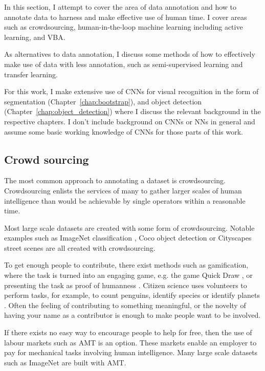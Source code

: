 In this section, I attempt to cover the area of data annotation and how to annotate data to harness and make effective use of human time. I cover areas such as crowdsourcing, human-in-the-loop machine learning including active learning, and \gls{VBA}.

As alternatives to data annotation, I discuss some methods of how to effectively make use of data with less annotation, such as semi-supervised learning and transfer learning. 

For this work, I make extensive use of \gls{CNN}s for visual recognition in the form of segmentation (Chapter~\ref{chap:bootstrap}), and object detection (Chapter~\ref{chap:object_detection}) where I discuss the relevant background in the respective chapters. I don't include background on \gls{CNN}s or \gls{NN}s in general and assume some basic working knowledge of \gls{CNN}s for those parts of this work.


\subsection {Crowd sourcing}

The most common approach to annotating a dataset is crowdsourcing. Crowdsourcing enlists the services of many to gather larger scales of human intelligence than would be achievable by single operators within a reasonable time.

Most large scale datasets are created with some form of crowdsourcing. Notable examples such as ImageNet classification \cite{JiaDeng2009}, Coco object detection \cite{Lin2014} or Cityscapes street scenes \cite{Cordts2016} are all created with crowdsourcing. 

To get enough people to contribute, there exist methods such as gamification, where the task is turned into an engaging game, e.g. the game Quick Draw \cite{Ha2017}, or presenting the task as proof of humanness \cite{Goodfellow2013a}. Citizen science uses volunteers to perform tasks, for example, to count penguins, identify species or identify planets \cite{Simpson2014, Masters2016}. Often the feeling of contributing to something meaningful, or the novelty of having your name as a contributor is enough to make people want to be involved.

If there exists no easy way to encourage people to help for free, then the use of labour markets such as \gls{AMT} is an option. These markets enable an employer to pay for mechanical tasks involving human intelligence. Many large scale datasets such as ImageNet \cite{Russakovsky2015} are built with \gls{AMT}. 


